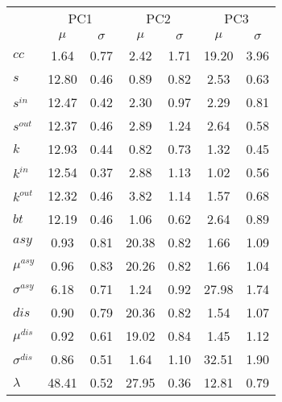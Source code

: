 \begin{center}
\begin{tabular}{| l || c | c | c | c | c | c |}\cline{2-7}
\multicolumn{1}{c|}{} & \multicolumn{2}{c|}{PC1}          & \multicolumn{2}{c|}{PC2} & \multicolumn{2}{c|}{PC3}  \\\cline{2-7}\multicolumn{1}{c|}{} & $\mu$            & $\sigma$ & $\mu$         & $\sigma$ & $\mu$ & $\sigma$  \\\hline
$cc$ & 1.64  & 0.77  & 2.42  & 1.71  & 19.20  & 3.96 \\\hline
$s$ & 12.80  & 0.46  & 0.89  & 0.82  & 2.53  & 0.63 \\
$s^{in}$ & 12.47  & 0.42  & 2.30  & 0.97  & 2.29  & 0.81 \\
$s^{out}$ & 12.37  & 0.46  & 2.89  & 1.24  & 2.64  & 0.58 \\
$k$ & 12.93  & 0.44  & 0.82  & 0.73  & 1.32  & 0.45 \\
$k^{in}$ & 12.54  & 0.37  & 2.88  & 1.13  & 1.02  & 0.56 \\
$k^{out}$ & 12.32  & 0.46  & 3.82  & 1.14  & 1.57  & 0.68 \\
$bt$ & 12.19  & 0.46  & 1.06  & 0.62  & 2.64  & 0.89 \\\hline
$asy$ & 0.93  & 0.81  & 20.38  & 0.82  & 1.66  & 1.09 \\
$\mu^{asy}$ & 0.96  & 0.83  & 20.26  & 0.82  & 1.66  & 1.04 \\
$\sigma^{asy}$ & 6.18  & 0.71  & 1.24  & 0.92  & 27.98  & 1.74 \\
$dis$ & 0.90  & 0.79  & 20.36  & 0.82  & 1.54  & 1.07 \\
$\mu^{dis}$ & 0.92  & 0.61  & 19.02  & 0.84  & 1.45  & 1.12 \\
$\sigma^{dis}$ & 0.86  & 0.51  & 1.64  & 1.10  & 32.51  & 1.90 \\\hline\hline
$\lambda$ & 48.41  & 0.52  & 27.95  & 0.36  & 12.81  & 0.79 \\
\hline\end{tabular}
\end{center}
